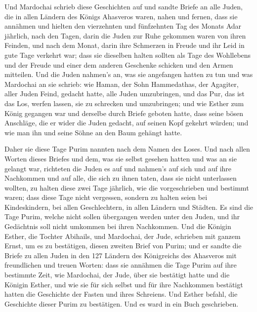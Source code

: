  Und Mardochai schrieb diese Geschichten auf und sandte
Briefe an alle Juden, die in allen Ländern des Königs Ahasveros waren,
nahen und fernen,  dass sie annähmen und hielten den
vierzehnten und fünfzehnten Tag des Monats Adar jährlich,
 nach den Tagen, darin die Juden zur Ruhe gekommen waren
von ihren Feinden, und nach dem Monat, darin ihre Schmerzen in Freude
und ihr Leid in gute Tage verkehrt war; dass sie dieselben halten
sollten als Tage des Wohllebens und der Freude und einer dem anderen
Geschenke schicken und den Armen mitteilen.  Und die
Juden nahmen's an, was sie angefangen hatten zu tun und was Mardochai an
sie schrieb:  wie Haman, der Sohn Hammedathas, der
Agagiter, aller Juden Feind, gedacht hatte, alle Juden umzubringen, und
das Pur, das ist das Los, werfen lassen, sie zu schrecken und
umzubringen;  und wie Esther zum König gegangen war und
derselbe durch Briefe geboten hatte, dass seine bösen Anschläge, die er
wider die Juden gedacht, auf seinen Kopf gekehrt würden; und wie man ihn
und seine Söhne an den Baum gehängt hatte.

 Daher sie diese Tage Purim nannten nach dem Namen des
Loses. Und nach allen Worten dieses Briefes und dem, was sie selbst
gesehen hatten und was an sie gelangt war,  richteten die
Juden es auf und nahmen's auf sich und auf ihre Nachkommen und auf alle,
die sich zu ihnen taten, dass sie nicht unterlassen wollten, zu halten
diese zwei Tage jährlich, wie die vorgeschrieben und bestimmt waren;
 dass diese Tage nicht vergessen, sondern zu halten seien
bei Kindeskindern, bei allen Geschlechtern, in allen Ländern und
Städten. Es sind die Tage Purim, welche nicht sollen übergangen werden
unter den Juden, und ihr Gedächtnis soll nicht umkommen bei ihren
Nachkommen.  Und die Königin Esther, die Tochter
Abihails, und Mardochai, der Jude, schrieben mit ganzem Ernst, um es zu
bestätigen, diesen zweiten Brief von Purim;  und er
sandte die Briefe zu allen Juden in den 127 Ländern des Königreichs des
Ahasveros mit freundlichen und treuen Worten:  dass sie
annähmen die Tage Purim auf ihre bestimmte Zeit, wie Mardochai, der
Jude, über sie bestätigt hatte und die Königin Esther, und wie sie für
sich selbst und für ihre Nachkommen bestätigt hatten die Geschichte der
Fasten und ihres Schreiens.  Und Esther befahl, die
Geschichte dieser Purim zu bestätigen. Und es ward in ein Buch
geschrieben.


